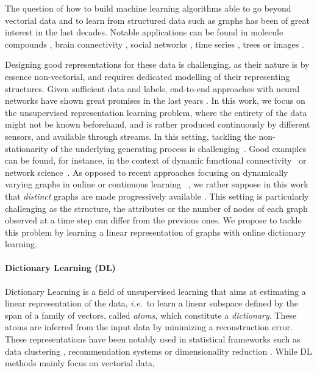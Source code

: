 \documentclass{article}
\newcommand{\ie}{\textit{i.e.}}
\begin{document}
	{The question of how to build machine learning algorithms able to go beyond
		vectorial data and to learn from structured data such as graphs has been of great
		interest in the last decades. Notable applications can be found in molecule
		compounds} \citep{kriege-recognizing-2018}, brain connectivity
	\citep{ktena-distance-2017}, social networks \citep{yanardag-deep-2015}, time
	series \citep{cuturi-soft-dtw-2018}, trees \citep{day-optimal-1985} {or} images
	\citep{harchaoui-image-2007,bronstein2017geometric}. {Designing good representations for these data is challenging, as their
		nature is by essence non-vectorial, and requires dedicated modelling of their representing structures. Given
		sufficient data and labels, end-to-end approaches with neural networks have
		shown great promises in the last years \cite{wu2020comprehensive}. In this work, we focus on the unsupervised representation learning problem, where
		the entirety of the data might not be known beforehand, and is rather produced
		continuously by different sensors, and available through streams. {In this setting, tackling the non-stationarity of the underlying generating process is challenging~\citep{Ditzler2015}.  Good examples can be found, for instance, in the context of 
			dynamic functional connectivity~\citep{Heitmann2018} or network
			science~\citep{masuda2020guide}. As opposed to recent approaches focusing on dynamically varying graphs in online or continuous learning ~\citep{yang2018bandit,vlaski2018online,Wang2020StreamingGN},
we rather suppose in this work that \emph{distinct} graphs are made progressively available \cite{Zambon,Grattarola}. This setting is particularly challenging as the structure, the attributes or the number of nodes of each graph observed at a time step can differ from the previous ones. We propose to tackle this problem by learning a linear representation of graphs with online dictionary learning.}
		\vspace{1.5mm}
		\paragraph{Dictionary Learning (DL)}
		
		Dictionary Learning \citep{mairal2009online,schmitz2018wasserstein} is a field of unsupervised learning that aims at estimating a linear representation of the data, \ie\ to learn a linear subspace defined by the span of a family of vectors, called \emph{atoms}, which constitute a \emph{dictionary}. These atoms are inferred from the input data by minimizing a reconstruction error. These representations have been notably used in statistical frameworks such as data clustering \citep{ng-spectral-2002},
		recommendation systems \citep{bobadilla2013recommender} or dimensionality
		reduction  \citep{candes-robust-2009}. While DL methods mainly
		focus on vectorial data, 
		
}
\end{document}
